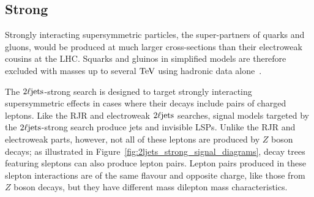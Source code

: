 \FloatBarrier
\subsection{Strong}
\label{sec:2ljets_origins_strong}
Strongly interacting supersymmetric particles, the super-partners of quarks and
gluons, would be produced at much larger cross-sections than their electroweak
cousins at the LHC.
Squarks and gluinos in simplified models are therefore excluded with masses up
to several $\eV[T]$ using hadronic data alone~\cite{atlas_susy_strong_0l}.

The $\twoljets$-strong search is designed to target strongly interacting
supersymmetric effects in cases where their decays include pairs of charged
leptons.
Like the RJR and electroweak $\twoljets$ searches, signal models targeted by
the $\twoljets$-strong search produce jets and invisible LSPs.
Unlike the RJR and electroweak parts, however, not all of these leptons are
produced by $Z$ boson decays;
as illustrated in Figure~\ref{fig:2ljets_strong_signal_diagrams}, decay trees
featuring sleptons can also produce lepton pairs.
Lepton pairs produced in these slepton interactions are of the same flavour
and opposite charge, like those from $Z$ boson decays, but they have different
mass dilepton mass characteristics.

